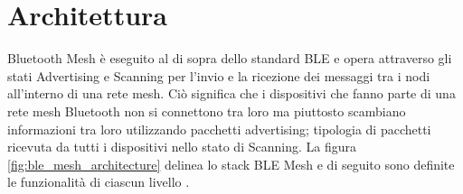\section{Architettura}
Bluetooth Mesh è eseguito al di sopra dello standard BLE e opera attraverso gli stati Advertising e Scanning per l'invio e la ricezione dei messaggi tra i nodi all'interno di una rete mesh. Ciò significa che i dispositivi che fanno parte di una rete mesh Bluetooth non si connettono tra loro ma piuttosto scambiano informazioni tra loro utilizzando pacchetti advertising; tipologia di pacchetti ricevuta da tutti i dispositivi nello stato di Scanning.
La figura \ref{fig:ble_mesh_architecture} delinea lo stack BLE Mesh e di seguito sono definite le funzionalità di ciascun livello \cite{afaneh2018intro, baert2018bluetooth}.


